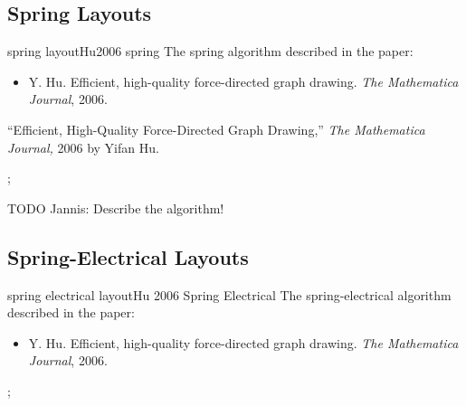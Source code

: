 


\subsection{Spring Layouts}


\begin{gdalgorithm}{spring layout}{Hu2006 spring}
  The spring algorithm described in the paper:

  \begin{itemize}
  \item
    Y. Hu.
    \newblock Efficient, high-quality force-directed graph drawing.
    \newblock \emph{The Mathematica Journal}, 2006.
  \end{itemize}

  ``Efficient, High-Quality
    Force-Directed Graph Drawing,'' \emph{The Mathematica Journal,}
    2006 by Yifan Hu. 
\begin{codeexample}[]
\tikz {};    
\end{codeexample}
  TODO Jannis: Describe the algorithm!
\end{gdalgorithm}


\subsection{Spring-Electrical Layouts}


\begin{gdalgorithm}{spring electrical layout}{Hu 2006 Spring Electrical}
  The spring-electrical algorithm described in the paper:
  \begin{itemize}
  \item
    Y. Hu.
    \newblock Efficient, high-quality force-directed graph drawing.
    \newblock \emph{The Mathematica Journal}, 2006.
  \end{itemize}
\begin{codeexample}[]
\tikz {};    
\end{codeexample}
\end{gdalgorithm}


